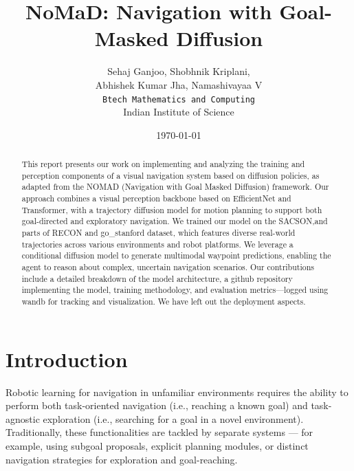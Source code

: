 \documentclass[12pt]{article}
\title{NoMaD: \textbf{N}avigati\textbf{o}n with Goal-\textbf{Ma}sked \textbf{D}iffusion}
\author{Sehaj Ganjoo, Shobhnik Kriplani, \\ Abhishek Kumar Jha, Namashivayaa V \\ \texttt{Btech Mathematics and Computing} \\ Indian Institute of Science}
\date{\today}
\begin{document}
\maketitle

\begin{abstract}
This report presents our work on implementing and analyzing the training and perception components of a visual navigation system based on diffusion policies, as adapted from the NOMAD (Navigation with Goal Masked Diffusion) framework. 
Our approach combines a visual perception backbone based on EfficientNet and Transformer, with a trajectory diffusion model for motion planning to support both goal-directed and exploratory navigation. We trained our model on the SACSON,and parts of RECON and go\_stanford dataset, which features diverse real-world trajectories across various environments and robot platforms. 
We leverage a conditional diffusion model to generate multimodal waypoint predictions, enabling the agent to reason about complex, uncertain navigation scenarios. Our contributions include a detailed breakdown of the model architecture, a github repository implementing the model, training methodology, and evaluation metrics—logged using wandb for tracking and visualization. 
We have left out the deployment aspects.
\end{abstract}


\section{Introduction}
Robotic learning for navigation in unfamiliar environments requires the ability to perform both task-oriented navigation (i.e., reaching a known goal) and task-agnostic exploration (i.e., searching for a goal in a novel environment). Traditionally, these functionalities are tackled by separate systems — for example, using subgoal proposals, explicit planning modules, or distinct navigation strategies for exploration and goal-reaching.
\end{document}
